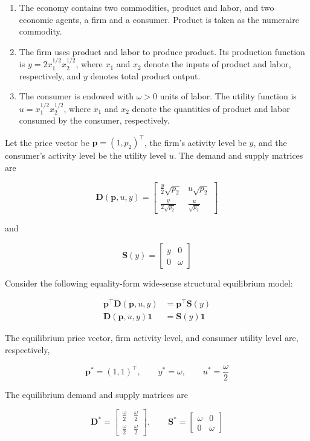 \documentclass[
  letterpaper,
  DIV=11,
  numbers=noendperiod]{scrreprt}
\begin{document}
\begin{enumerate}
\def\labelenumi{\arabic{enumi}.}
\item
  The economy contains two commodities, product and labor, and two
  economic agents, a firm and a consumer. Product is taken as the
  numeraire commodity.
\item
  The firm uses product and labor to produce product. Its production
  function is \(y=2x_1^{1/2}x_2^{1/2}\), where \(x_1\) and \(x_2\)
  denote the inputs of product and labor, respectively, and \(y\)
  denotes total product output.
\item
  The consumer is endowed with \(\omega>0\) units of labor. The utility
  function is \(u=x_{1}^{1/2}x_{2}^{1/2}\), where \(x_{1}\) and
  \(x_{2}\) denote the quantities of product and labor consumed by the
  consumer, respectively.
\end{enumerate}

Let the price vector be \(\mathbf p=(1,p_2)^\top\), the firm's activity
level be \(y\), and the consumer's activity level be the utility level
\(u\). The demand and supply matrices are

\[
\mathbf D(\mathbf p,u,y)
=
\begin{bmatrix}
\frac{y}{2}\sqrt{p_2} & u\sqrt{p_2}\\[8pt]
\frac{y}{2\sqrt{p_2}} & \frac{u}{\sqrt{p_2}}
\end{bmatrix}
\]

and

\[
\mathbf S(y)
=
\begin{bmatrix}
y & 0\\
0 & \omega
\end{bmatrix}
\]

Consider the following equality-form wide-sense structural equilibrium
model:

\[
\begin{aligned}
\mathbf p^\top\mathbf D(\mathbf p,u,y)
&=\mathbf p^\top\mathbf S(y)\\
\mathbf D(\mathbf p,u,y)\mathbf 1
&=\mathbf S(y)\mathbf 1
\end{aligned}
\]

The equilibrium price vector, firm activity level, and consumer utility
level are, respectively,

\[
\mathbf p^*=(1,1)^\top,\qquad
y^*=\omega,\qquad
u^*=\frac{\omega}{2}
\]

The equilibrium demand and supply matrices are

\[
\mathbf D^*
=
\begin{bmatrix}
\frac{\omega}{2} & \frac{\omega}{2}\\[6pt]
\frac{\omega}{2} & \frac{\omega}{2}
\end{bmatrix},
\qquad
\mathbf S^*
=
\begin{bmatrix}
\omega & 0\\
0 & \omega
\end{bmatrix}
\]
\end{document}

